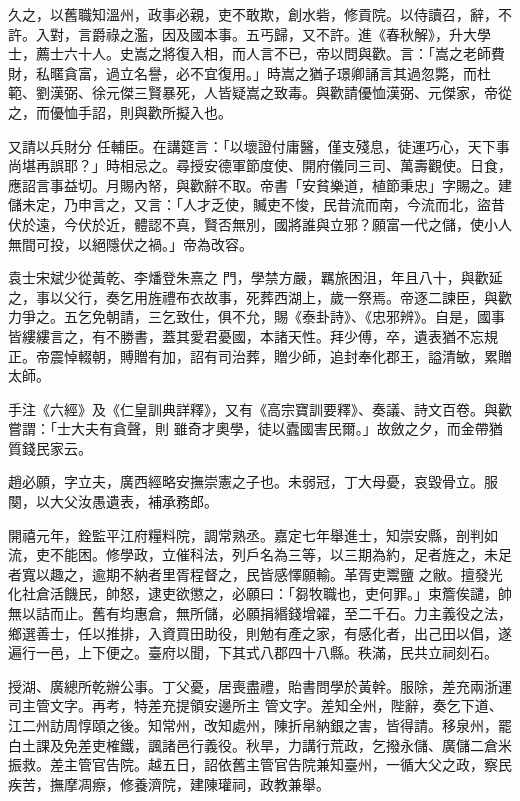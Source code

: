 \begin{pinyinscope}
 久之，以舊職知溫州，政事必親，吏不敢欺，創水砦，修貢院。以侍讀召，辭，不許。入對，言爵祿之濫，因及國本事。五丐歸，又不許。進《春秋解》，升大學士，薦士六十人。史嵩之將復入相，而人言不已，帝以問與歡。言：「嵩之老師費財，私暱貪富，過立名譽，必不宜復用。」時嵩之猶子璟卿誦言其過忽斃，而杜範、劉漢弼、徐元傑三賢暴死，人皆疑嵩之致毒。與歡請優恤漢弼、元傑家，帝從之，而優恤手詔，則與歡所擬入也。



 又請以兵財分
 任輔臣。在講筵言：「以壞證付庸醫，僅支殘息，徒運巧心，天下事尚堪再誤耶？」時相忌之。尋授安德軍節度使、開府儀同三司、萬壽觀使。日食，應詔言事益切。月賜內帑，與歡辭不取。帝書「安貧樂道，植節秉忠」字賜之。建儲未定，乃申言之，又言：「人才乏使，贓吏不悛，民昔流而南，今流而北，盜昔伏於遠，今伏於近，體認不真，賢否無別，國將誰與立邪？願富一代之儲，使小人無間可投，以絕隱伏之禍。」帝為改容。



 袁士宋斌少從黃乾、李燔登朱熹之
 門，學禁方嚴，羈旅困沮，年且八十，與歡延之，事以父行，奏乞用旌禮布衣故事，死葬西湖上，歲一祭焉。帝逐二諫臣，與歡力爭之。五乞免朝請，三乞致仕，俱不允，賜《泰卦詩》、《忠邪辨》。自是，國事皆縷縷言之，有不勝書，蓋其愛君憂國，本諸天性。拜少傅，卒，遺表猶不忘規正。帝震悼輟朝，賻贈有加，詔有司治葬，贈少師，追封奉化郡王，謚清敏，累贈太師。



 手注《六經》及《仁皇訓典詳釋》，又有《高宗寶訓要釋》、奏議、詩文百卷。與歡嘗謂：「士大夫有貪聲，則
 雖奇才奧學，徒以蠹國害民爾。」故斂之夕，而金帶猶質錢民家云。



 趙必願，字立夫，廣西經略安撫崇憲之子也。未弱冠，丁大母憂，哀毀骨立。服闋，以大父汝愚遺表，補承務郎。



 開禧元年，銓監平江府糧料院，調常熟丞。嘉定七年舉進士，知崇安縣，剖判如流，吏不能困。修學政，立催科法，列戶名為三等，以三期為約，足者旌之，未足者寬以趣之，逾期不納者里胥程督之，民皆感懌願輸。革胥吏鬻鹽
 之敝。擅發光化社倉活饑民，帥怒，逮吏欲懲之，必願曰：「芻牧職也，吏何罪。」束簷俟譴，帥無以詰而止。舊有均惠倉，無所儲，必願捐緡錢增糴，至二千石。力主義役之法，鄉選善士，任以推排，入資買田助役，則勉有產之家，有感化者，出己田以倡，遂遍行一邑，上下便之。臺府以聞，下其式八郡四十八縣。秩滿，民共立祠刻石。



 授湖、廣總所乾辦公事。丁父憂，居喪盡禮，貽書問學於黃幹。服除，差充兩浙運司主管文字。再考，特差充提領安邊所主
 管文字。差知全州，陛辭，奏乞下道、江二州訪周惇頤之後。知常州，改知處州，陳折帛納銀之害，皆得請。移泉州，罷白土課及免差吏榷鐵，諷諸邑行義役。秋旱，力講行荒政，乞撥永儲、廣儲二倉米振救。差主管官告院。越五日，詔依舊主管官告院兼知臺州，一循大父之政，察民疾苦，撫摩凋瘵，修養濟院，建陳瓘祠，政教兼舉。




\end{pinyinscope}
